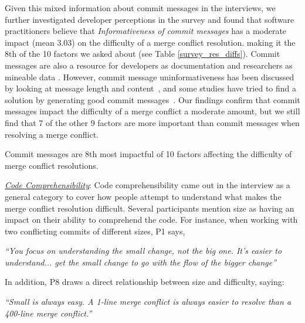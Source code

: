 Given this mixed information about commit messages in the interviews, we further investigated developer perceptions in the survey and found that software practitioners believe that \textit{Informativeness of commit messages} has a moderate impact (mean 3.03) on the difficulty of a merge conflict resolution. making it the 8th  of the 10 factors we asked about (see Table \ref{survey_res_diffs}). Commit messages are also a resource for developers as documentation and researchers as mineable data \cite{d2010commit}. However, commit message uninformativeness has been discussed by looking at message length and content~\cite{maalej2010can}, and some studies have tried to find a solution by generating good commit messages~\cite{cortes2014}. Our findings confirm that commit messages impact the difficulty of a merge conflict a moderate amount, but we still find that 7 of the other 9 factors are more important than commit messages when resolving a merge conflict.

\begin{tcolorbox}[enhanced,minipage boxed title,enhanced,title={Takeaway \arabic{takeawaycounter}},
attach boxed title to top left=
{xshift=0mm,yshift=-1mm},
boxed title style={size=small}]
Commit messages are 8th most impactful of 10 factors affecting the difficulty of merge conflict resolutions.
\end{tcolorbox}
\addtocounter{takeawaycounter}{1}


\underline{\textit{Code Comprehensibility}}:
Code comprehensibility came out in the interview as a general category to cover how people attempt to understand what makes the merge conflict resolution difficult. Several participants mention size as having an impact on their ability to comprehend the code. For instance, when working with two conflicting commits of different sizes, P1 says,
\begin{displayquote}
\textit{``You focus on understanding the small change, not the big one. It's easier to understand... get the small change to go with the flow of the bigger change''}
\end{displayquote}	

In addition, P8 draws a direct relationship between size and difficulty, saying:
\begin{displayquote}
\textit{``Small is always easy. A 1-line merge conflict is always easier to resolve than a 400-line merge conflict.''}
\end{displayquote}

